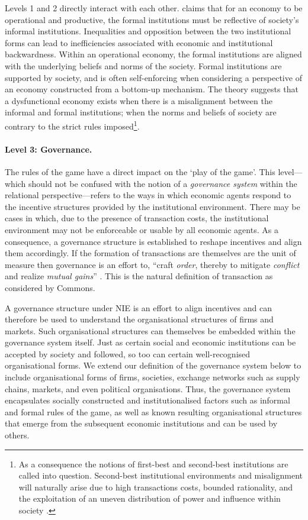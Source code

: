 Levels 1 and 2 directly interact with each other. \citet[p.~5]{Sautet2005} claims that for an economy to be operational and productive, the formal institutions must be reflective of society's informal institutions. Inequalities and opposition between the two institutional forms can lead to inefficiencies associated with economic and institutional backwardness. Within an operational economy, the formal institutions are aligned with the underlying beliefs and norms of the society. Formal institutions are supported by society, and is often self-enforcing when considering a perspective of an economy constructed from a bottom-up mechanism. The theory suggests that a dysfunctional economy exists when there is a misalignment between the informal and formal institutions; when the norms and beliefs of society are contrary to the strict rules imposed\footnote{As a consequence the notions of first-best and second-best institutions \citep{Rodrik2008} are called into question. Second-best institutional environments and misalignment will naturally arise due to high transactions costs, bounded rationality, and the exploitation of an uneven distribution of power and influence within society \citep{DouhanHenrekson2010}.}.

\paragraph{Level 3: Governance.}

The rules of the game have a direct impact on the `play of the game'. This level---which should not be confused with the notion of a \emph{governance system} within the relational perspective---refers to the ways in which economic agents respond to the incentive structures provided by the institutional environment. There may be cases in which, due to the presence of transaction costs, the institutional environment may not be enforceable or usable by all economic agents. As a consequence, a governance structure is established to reshape incentives and align them accordingly. If the formation of transactions are themselves are the unit of measure then governance is an effort to, ``craft \emph{order}, thereby to mitigate \emph{conflict} and realize \emph{mutual gains}'' \citep[p.~599]{Williamson2000}. This is the natural definition of transaction as considered by Commons.

A governance structure under NIE is an effort to align incentives and can therefore be used to understand the organisational structures of firms and markets. Such organisational structures can themselves be embedded within the governance system itself. Just as certain social and economic institutions can be accepted by society and followed, so too can certain well-recognised organisational forms. We extend our definition of the governance system below to include organisational forms of firms, societies, exchange networks such as supply chains, markets, and even political organisations. Thus, the governance system encapsulates socially constructed and institutionalised factors such as informal and formal rules of the game, as well as known resulting organisational structures that emerge from the subsequent economic institutions and can be used by others.

